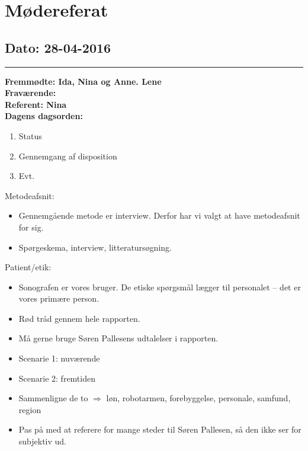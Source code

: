 \chapter{Mødereferat}

\section{Dato: 28-04-2016}
\hrule
\textbf{Fremmødte: Ida, Nina og Anne. Lene} \\
\textbf{Fraværende:} \\
\textbf{Referent: Nina } \\
\textbf{Dagens dagsorden: }
\begin{enumerate}
	\item Status
\item Gennemgang af disposition
\item Evt.
\end{enumerate}

Metodeafsnit:
\begin{itemize}
\item Gennemgående metode er interview. Derfor har vi valgt at have metodeafsnit for sig.
\item Spørgeskema, interview, litteratursøgning.
\end{itemize}
Patient/etik:
\begin{itemize}
\item Sonografen er vores bruger. De etiske spørgsmål lægger til personalet – det er vores primære person. 
\item Rød tråd gennem hele rapporten. 
\item Må gerne bruge Søren Pallesens udtalelser i rapporten. 
\item Scenarie 1: nuværende
\item Scenarie 2: fremtiden
\item Sammenligne de to $\Rightarrow$ løn, robotarmen, forebyggelse, personale, samfund, region
\item Pas på med at referere for mange steder til Søren Pallesen, så den ikke ser for subjektiv ud. 

\end{itemize}

\newpage


